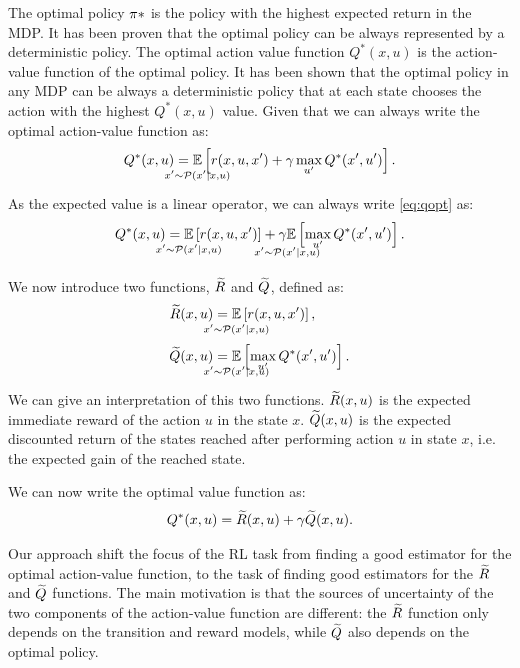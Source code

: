 \documentclass[conference]{IEEEtran}
\begin{document}
The optimal policy $\pi*$ is the policy with the highest expected return in the MDP. It has been proven that the optimal policy can be always represented by a deterministic policy. The optimal action value function $Q^*(x, u)$ is the action-value function of the optimal policy.
It has been shown that the optimal policy in any MDP can be always a deterministic policy that at each state chooses the action with the highest $Q^*(x, u)$ value.
Given that we can always write the optimal action-value function as:
\begin{align}
 Q^*(x,u)=\underset{\strut\mathclap{x'\sim \Pmodel(x'|x,u)}}{\mathbb{E}}\left[ r(x,u,x')+\gamma\max_{u'} Q^*(x',u')\right].
 \label{eq:qopt}
\end{align}
As the expected value is a linear operator, we can always write \ref{eq:qopt} as:
\begin{align}
 Q^*(x,u)=\underset{\strut\mathclap{x'\sim \Pmodel(x'|x,u)}}{\mathbb{E}}\left[ r(x,u,x')\right]+\underset{\strut\mathclap{x'\sim \Pmodel(x'|x,u)}}{\gamma\mathbb{E}}\left[ \max_{u'} Q^*(x',u')\right].
 \label{eq:qdec}
\end{align}

We now introduce two functions, $\widetilde{R}$ and $\widetilde{Q}$, defined as:
\begin{align}
 \Rtilde(x,u)&=\underset{\strut\mathclap{x'\sim \Pmodel(x'|x,u)}}{\mathbb{E}}\left[ r(x,u,x')\right], \nonumber\ \\
 \Qtilde(x,u)&=\underset{\strut\mathclap{x'\sim \Pmodel(x'|x,u)}}{\mathbb{E}}\left[\max_{u'} Q^*(x',u')\right].
 \label{eq:rqtilde}
\end{align}
We can give an interpretation of this two functions. $\widetilde{R}(x,u)$ is the expected immediate reward of the action $u$ in the state $x$. $\widetilde{Q}(x,u)$ is the expected discounted return of the states reached after performing action $u$ in state $x$, i.e. the expected gain of the reached state.

We can now write the optimal value function as:
\begin{align}
 Q^*(x,u)=\Rtilde(x,u)+\gamma\Qtilde(x,u).
 \label{eq:qdecrqtilde}
\end{align}

Our approach shift the focus of the RL task from finding a good estimator for the optimal action-value function, to the task of finding good estimators for the $\widetilde{R}$ and $\widetilde{Q}$ functions. The main motivation is that the sources of uncertainty of the two components of the action-value function are different: the $\widetilde{R}$ function only depends on the transition and reward models, while $\widetilde{Q}$ also depends on the optimal policy.
\end{document}
